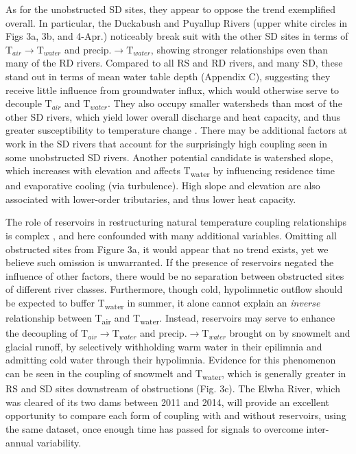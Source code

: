 \documentclass[notitlepage]{article}
\begin{document}
As for the unobstructed SD sites, they appear to oppose the trend exemplified overall. In particular, the Duckabush and Puyallup Rivers (upper white circles in Figs 3a, 3b, and 4-Apr.) noticeably break suit with the other SD sites in terms of $\textrm{T}_{air}\rightarrow \textrm{T}_{water}$ and $\textrm{precip.}\rightarrow \textrm{T}_{water}$, showing stronger relationships even than many of the RD rivers. Compared to all RS and RD rivers, and many SD, these stand out in terms of mean water table depth (Appendix C), suggesting they receive little influence from groundwater influx, which would otherwise serve to decouple $\textrm{T}_{air}$ and $\textrm{T}_{water}$. They also occupy smaller watersheds than most of the other SD rivers, which yield lower overall discharge and heat capacity, and thus greater susceptibility to temperature change \citep{caissie2006thermal}. There may be additional factors at work in the SD rivers that account for the surprisingly high coupling seen in some unobstructed SD rivers. Another potential candidate is watershed slope, which increases with elevation and affects T\textsubscript{water} by influencing residence time and evaporative cooling (via turbulence). High slope and elevation are also associated with lower-order tributaries, and thus lower heat capacity. 

The role of reservoirs in restructuring natural temperature coupling relationships is complex \citep{damsComplex,WarmingPostDam}, and here confounded with many additional variables. Omitting all obstructed sites from Figure 3a, it would appear that no trend exists, yet we believe such omission is unwarranted. If the presence of reservoirs negated the influence of other factors, there would be no separation between obstructed sites of different river classes. Furthermore, though cold, hypolimnetic outflow should be expected to buffer T\textsubscript{water} in summer, it alone cannot explain an {\it inverse} relationship between T\textsubscript{air} and T\textsubscript{water}. Instead, reservoirs may serve to enhance the decoupling of $\textrm{T}_{air}\rightarrow \textrm{T}_{water}$ and $\textrm{precip.}\rightarrow \textrm{T}_{water}$ brought on by snowmelt and glacial runoff, by selectively withholding warm water in their epilimnia and admitting cold water through their hypolimnia. Evidence for this phenomenon can be seen in the coupling of snowmelt and T\textsubscript{water}, which is generally greater in RS and SD sites downstream of obstructions (Fig. 3c). The Elwha River, which was cleared of its two dams between 2011 and 2014, will provide an excellent opportunity to compare each form of coupling with and without reservoirs, using the same dataset, once enough time has passed for signals to overcome inter-annual variability.
\end{document}
